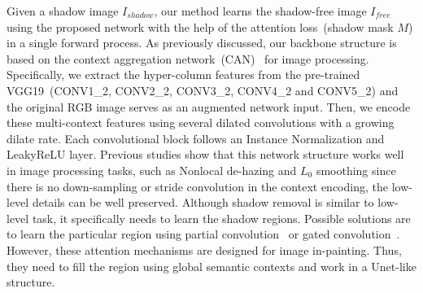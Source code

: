 \documentclass[letterpaper]{article} \usepackage{aaai20}  \usepackage{times}  \usepackage{helvet} \usepackage{courier}  \usepackage[hyphens]{url}  \urlstyle{rm} \def\UrlFont{\rm}  \usepackage{graphicx}  \frenchspacing  \setlength{\pdfpagewidth}{8.5in}  \setlength{\pdfpageheight}{11in}  \usepackage{amssymb}
\begin{document}
Given a shadow image $I_{shadow}$, our method learns the shadow-free image $I_{free}$ using the proposed network with the help of the attention loss~(shadow mask $M$) in a single forward process. 
As previously discussed, our backbone structure is based on the context aggregation network~(CAN)~\cite{chen2017fast,2018arXiv180605376Z} for image processing. Specifically, we extract the hyper-column features from the pre-trained VGG19~(CONV1\_2, CONV2\_2, CONV3\_2, CONV4\_2 and CONV5\_2) and the original RGB image serves as an augmented network input. Then, we encode these multi-context features using several dilated convolutions with a growing dilate rate. Each convolutional block follows an Instance Normalization and LeakyReLU layer. Previous studies show that this network structure works well in image processing tasks, such as Nonlocal de-hazing and $L_0$ smoothing since there is no down-sampling or stride convolution in the context encoding, the low-level details can be well preserved. Although shadow removal is similar to low-level task, it specifically needs to learn the shadow regions. Possible solutions are to learn the particular region using partial convolution~\cite{liu2018image} or gated convolution~\cite{yu2018free}.  However, these attention mechanisms are designed for image in-painting. Thus, they need to fill the region using global semantic contexts and work in a Unet-like structure. 
\end{document}
